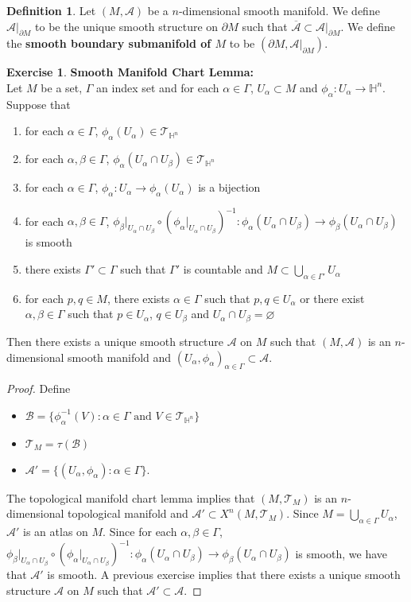 \documentclass{book}
\theoremstyle{definition}
\newtheorem{defn}[definition]{Definition}
\newtheorem{ex}[definition]{Exercise}
\newcommand{\al}{\alpha}
\newcommand{\be}{\beta}
\newcommand{\Gam}{\Gamma}
\renewcommand{\H}{\mathbb{H}}
\newcommand{\MA}{\mathcal{A}}
\newcommand{\MB}{\mathcal{B}}
\newcommand{\MT}{\mathcal{T}}
\DeclareMathOperator*{\0}{\mbf{0}}
\DeclareMathOperator*{\1}{\mbf{1}}
\newcommand{\tbf}[1]{\textbf{#1}}
\newcommand{\ol}[1]{\overline{#1}}
\newcommand{\p}{\partial}
\begin{document}
	\begin{defn}
		Let $(M, \MA)$ be a $n$-dimensional smooth manifold. We define $\MA|_{\p M}$ to be the unique smooth structure on $\p M$ such that $\ol{\MA} \subset \MA|_{\p M}$. We define the \tbf{smooth boundary submanifold of $M$} to be $(\p M, \MA|_{\p M})$.
	\end{defn}

	
	\begin{ex} \tbf{Smooth Manifold Chart Lemma:} \\
		Let $M$ be a set, $\Gam$ an index set and for each $\al \in \Gam$, $U_{\al} \subset M$ and $\phi_{\al}: U_{\al} \rightarrow \H^n$. Suppose that 
		\begin{enumerate}[label=(\alph*)]
			\item for each $\al \in \Gam$, $\phi_{\al}(U_{\al}) \in \MT_{\H^n}$
			\item for each $\al, \be \in \Gam$, $\phi_{\al}(U_{\al} \cap U_{\be}) \in \MT_{\H^n}$
			\item for each $\al \in \Gam$, $\phi_{\al}: U_{\al} \rightarrow \phi_{\al}(U_{\al})$ is a bijection
			\item for each $\al, \be \in \Gam$, $\phi_{\be}|_{U_{\al} \cap U_{\be}} \circ (\phi_{\al}|_{U_{\al} \cap U_{\be}})^{-1}: \phi_{\al}(U_{\al} \cap U_{\be}) \rightarrow \phi_{\be}(U_{\al} \cap U_{\be})$ is smooth
			\item there exists $\Gam' \subset \Gam$ such that $\Gam'$ is countable and $M \subset \bigcup\limits_{\al \in \Gam'} U_{\al}$
			\item for each $p,q \in M$, there exists $\al \in \Gam$ such that $p,q \in U_{\al}$ or there exist $\al,\be \in \Gam$ such that $p \in U_{\al}$, $q \in U_{\be}$ and $U_{\al} \cap U_{\be} = \varnothing$
		\end{enumerate}
		Then there exists a unique smooth structure $\MA$ on $M$ such that $(M, \MA)$ is an $n$-dimensional smooth manifold and $(U_{\al}, \phi_{\al})_{\al \in \Gam} \subset \MA$.
	\end{ex}

	\begin{proof}
		Define
		\begin{itemize}
			\item $\MB = \{\phi_{\al}^{-1}(V): \al \in \Gam \text{ and } V \in \MT_{\H^n}\}$ 
			\item $\MT_M = \tau(\MB)$ 
			\item $\MA' = \{(U_{\al}, \phi_{\al}) : \al \in \Gam\}$.
		\end{itemize}
		The topological manifold chart lemma implies that $(M, \MT_M)$ is an $n$-dimensional topological manifold and $\MA' \subset X^n(M, \MT_M)$. Since $M = \bigcup_{\al \in \Gam} U_{\al}$, $\MA'$ is an atlas on $M$. Since for each $\al, \be \in \Gam$, $\phi_{\be}|_{U_{\al} \cap U_{\be}} \circ (\phi_{\al}|_{U_{\al} \cap U_{\be}})^{-1}: \phi_{\al}(U_{\al} \cap U_{\be}) \rightarrow \phi_{\be}(U_{\al} \cap U_{\be})$ is smooth, we have that $\MA'$ is smooth. A previous exercise implies that there exists a unique smooth structure $\MA$ on $M$ such that $\MA' \subset \MA$. 
	\end{proof}
	
\end{document}
